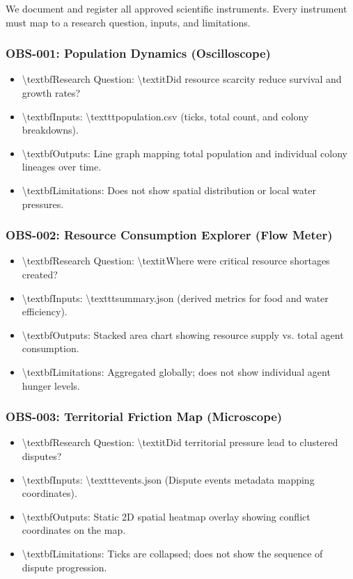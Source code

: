 \documentclass[11pt,a4paper]{article}
\begin{document}
We document and register all approved scientific instruments. Every instrument must map to a research question, inputs, and limitations.

\subsubsection*{OBS-001: Population Dynamics (Oscilloscope)}
\begin{itemize}
  \item \textbackslash{}textbf{Research Question}: \textbackslash{}textit{Did resource scarcity reduce survival and growth rates?}
  \item \textbackslash{}textbf{Inputs}: \textbackslash{}texttt{population.csv} (ticks, total count, and colony breakdowns).
  \item \textbackslash{}textbf{Outputs}: Line graph mapping total population and individual colony lineages over time.
  \item \textbackslash{}textbf{Limitations}: Does not show spatial distribution or local water pressures.
\end{itemize}

\subsubsection*{OBS-002: Resource Consumption Explorer (Flow Meter)}
\begin{itemize}
  \item \textbackslash{}textbf{Research Question}: \textbackslash{}textit{Where were critical resource shortages created?}
  \item \textbackslash{}textbf{Inputs}: \textbackslash{}texttt{summary.json} (derived metrics for food and water efficiency).
  \item \textbackslash{}textbf{Outputs}: Stacked area chart showing resource supply vs. total agent consumption.
  \item \textbackslash{}textbf{Limitations}: Aggregated globally; does not show individual agent hunger levels.
\end{itemize}

\subsubsection*{OBS-003: Territorial Friction Map (Microscope)}
\begin{itemize}
  \item \textbackslash{}textbf{Research Question}: \textbackslash{}textit{Did territorial pressure lead to clustered disputes?}
  \item \textbackslash{}textbf{Inputs}: \textbackslash{}texttt{events.json} (Dispute events metadata mapping coordinates).
  \item \textbackslash{}textbf{Outputs}: Static 2D spatial heatmap overlay showing conflict coordinates on the map.
  \item \textbackslash{}textbf{Limitations}: Ticks are collapsed; does not show the sequence of dispute progression.
\end{itemize}
\end{document}
